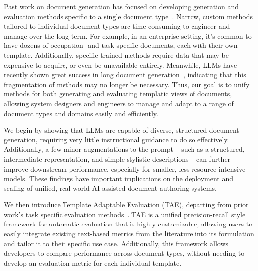 Past work on document generation has focused on developing generation and evaluation methods specific to a single document type~\cite{Fu2021DOC2PPTAP,Qiang2016LearningTG,chandrasekaran2020overview}. 
Narrow, custom methods tailored to individual document types are time consuming to engineer and manage over the long term. For example, in an enterprise setting, it’s common to have dozens of occupation- and task-specific documents, each with their own template.
Additionally, specific trained methods require data that may be expensive to acquire, or even be unavailable entirely. Meanwhile, LLMs have recently shown great success in long document generation~\cite{radford2019language,Brown2020LanguageMA}, indicating that this fragmentation of methods may no longer be necessary. Thus, our goal is to unify methods for both generating and evaluating templatic views of documents, allowing system designers and engineers to manage and adapt to a range of document types and domains easily and efficiently. 

We begin by showing that LLMs are capable of diverse, structured document generation, requiring very little instructional guidance to do so effectively. Additionally, a few minor augmentations to the prompt -- such as a structured, intermediate representation, and simple stylistic descriptions -- can further improve downstream performance, especially for smaller, less resource intensive models. These findings have important implications on the deployment and scaling of unified, real-world AI-assisted document authoring systems.

We then introduce Template Adaptable Evaluation (TAE), departing from prior work's task specific evaluation methods~\cite{zhang2020bertscore,Qiang2016LearningTG,Wang2015iPosterIP}. TAE is a unified precision-recall style framework for automatic evaluation that is highly customizable, allowing users to easily integrate existing text-based metrics from the literature into its formulation and tailor it to their specific use case. Additionally, this framework allows developers to compare performance across document types, without needing to develop an evaluation metric for each individual template.


